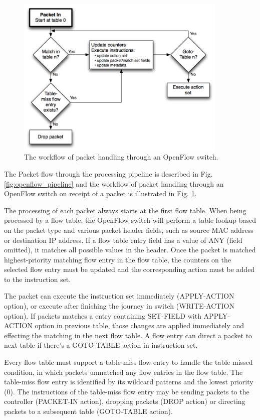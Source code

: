 \begin{figure}[!t]
\centering
\includegraphics[width=0.9\textwidth]{./fig/openflow_matching}
\caption{The workflow of packet handling through an OpenFlow switch. \cite{openflow-spec}}
\label{fig:openflow_matching}
\end{figure}

The Packet flow through the processing pipeline is described in Fig. \ref{fig:openflow_pipeline} and the workflow of packet handling through an OpenFlow switch on receipt of a packet is illustrated in Fig. \ref{fig:openflow_matching}.

The processing of each packet always starts at the first flow table.
When being processed by a flow table, the OpenFlow switch will perform a table lookup based on the packet type and various packet header fields, such as source MAC address or destination IP address.
If a flow table entry field has a value of ANY (field omitted), it matches all possible values in the header.
Once the packet is matched highest-priority matching flow entry in the flow table, the counters on the selected flow entry must be updated and the corresponding action must be added to the instruction set.

The packet can execute the instruction set immediately (APPLY-ACTION option), or execute after finishing the journey in switch (WRITE-ACTION option).
If packets matches a entry containing SET-FIELD with APPLY-ACTION option in previous table, those changes are applied immediately and effecting the matching in the next flow table.
A flow entry can direct a packet to next table if there's a GOTO-TABLE action in instruction set.

Every flow table must support a table-miss flow entry to handle the table missed condition, in which packets unmatched any flow entries in the flow table. The table-miss flow entry is identified by its wildcard patterns and the lowest priority (0). The instructions of the table-miss flow entry may be sending packets to the controller (PACKET-IN action), dropping packets (DROP action) or directing packets to a subsequent table (GOTO-TABLE action).




